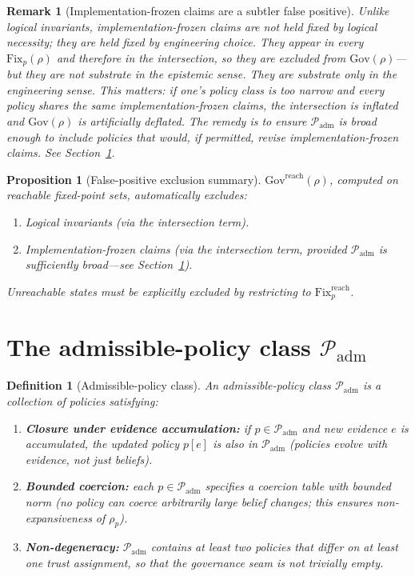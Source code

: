 \documentclass[11pt]{article}
\newtheorem{definition}{Definition}
\newtheorem{proposition}{Proposition}
\newtheorem{remark}{Remark}
\newcommand{\Gov}{\mathrm{Gov}}
\newcommand{\Fix}{\mathrm{Fix}}
\newcommand{\Padm}{\mathcal{P}_{\mathrm{adm}}}
\begin{document}
\begin{remark}[Implementation-frozen claims are a subtler false positive]
Unlike logical invariants, implementation-frozen claims are not held fixed by logical
necessity; they are held fixed by engineering choice. They appear in every $\Fix_p(\rho)$ and
therefore in the intersection, so they are excluded from $\Gov(\rho)$---but they are not
\emph{substrate} in the epistemic sense. They are substrate only in the engineering sense.
This matters: if one's policy class is too narrow and every policy shares the same
implementation-frozen claims, the intersection is inflated and $\Gov(\rho)$ is artificially
deflated. The remedy is to ensure $\Padm$ is broad enough to include policies that would, if
permitted, revise implementation-frozen claims. See Section~\ref{sec:admissible}.
\end{remark}

\begin{proposition}[False-positive exclusion summary]
\label{prop:false-positives}
$\Gov^{\mathrm{reach}}(\rho)$, computed on reachable fixed-point sets, automatically excludes:
\begin{enumerate}
  \item Logical invariants (via the intersection term).
  \item Implementation-frozen claims (via the intersection term, \emph{provided} $\Padm$ is
        sufficiently broad---see Section~\ref{sec:admissible}).
\end{enumerate}
Unreachable states must be explicitly excluded by restricting to $\Fix_p^{\mathrm{reach}}$.
\end{proposition}

\section{The admissible-policy class $\Padm$}
\label{sec:admissible}

\begin{definition}[Admissible-policy class]
\label{def:padm}
An \emph{admissible-policy class} $\Padm$ is a collection of policies satisfying:
\begin{enumerate}
  \item \textbf{Closure under evidence accumulation:} if $p \in \Padm$ and new evidence $e$
        is accumulated, the updated policy $p[e]$ is also in $\Padm$ (policies evolve with
        evidence, not just beliefs).
  \item \textbf{Bounded coercion:} each $p \in \Padm$ specifies a coercion table with bounded
        norm (no policy can coerce arbitrarily large belief changes; this ensures non-expansiveness
        of $\rho_p$).
  \item \textbf{Non-degeneracy:} $\Padm$ contains at least two policies that differ on at least
        one trust assignment, so that the governance seam is not trivially empty.
\end{enumerate}
\end{definition}
\end{document}
